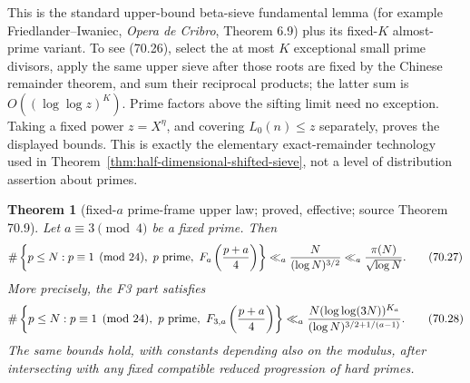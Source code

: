 \documentclass[10pt,reqno]{amsart}
\newtheorem{theorem}{Theorem}[section]
\theoremstyle{definition}
\newcommand{\1}{\mathbf 1}
\begin{document}
This is the standard upper-bound beta-sieve fundamental lemma (for example
Friedlander--Iwaniec, \emph{Opera de Cribro}, Theorem 6.9) plus its fixed-$K$
almost-prime variant.  To see (70.26), select the at most $K$ exceptional
small prime divisors, apply the same upper sieve after those roots are
fixed by the Chinese remainder theorem, and sum their reciprocal products;
the latter sum is $O((\log\log z)^K)$.  Prime factors above the sifting
limit need no exception.  Taking a fixed power $z=X^\eta$, and covering
$L_0(n)\leq z$ separately, proves the displayed bounds.  This is exactly
the elementary exact-remainder technology used in Theorem~\ref{thm:half-dimensional-shifted-sieve}, not a level
of distribution assertion about primes.

\begin{theorem}[fixed-$a$ prime-frame upper law; proved, effective; source Theorem 70.9]\label{thm:prime-frame-upper}  Let
$a\equiv3\pmod4$ be a fixed prime.  Then
\begin{equation}
 \#\left\{p\leq N:p\equiv1\pmod {24},\ p\text{ prime},\
       F_a\left({p+a\over4}\right)\right\}
       \ll_a {N\over(\log N)^{3/2}}
       \ll_a {\pi(N)\over\sqrt{\log N}}.                 \tag{70.27}
\end{equation}
More precisely, the F3 part satisfies
\begin{equation}
 \#\left\{p\leq N:p\equiv1\pmod {24},\ p\text{ prime},\
       F_{3,a}\left({p+a\over4}\right)\right\}
 \ll_a {N(\log\log(3N))^{K_a}
              \over(\log N)^{3/2+1/(a-1)}}.              \tag{70.28}
\end{equation}
The same bounds hold, with constants depending also on the modulus, after
intersecting with any fixed compatible reduced progression of hard primes.

\end{theorem}
\end{document}
